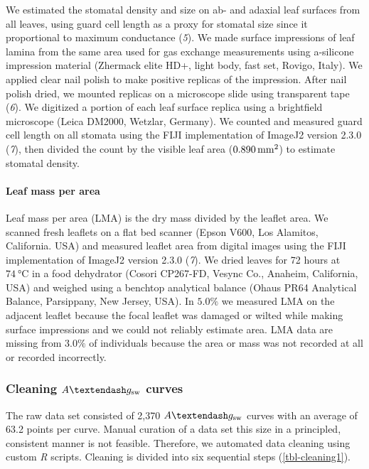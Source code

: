 \documentclass[
  letterpaper,
  DIV=11,
  numbers=noendperiod]{scrartcl}
\let\oldparagraph\paragraph
\renewcommand{\paragraph}[1]{\oldparagraph{#1}\mbox{}}
\newcommand{\agcurve}{$A \textendash g_\text{sw}$}
\begin{document}
We estimated the stomatal density and size on ab- and adaxial leaf
surfaces from all leaves, using guard cell length as a proxy for
stomatal size since it proportional to maximum conductance (\emph{5}).
We made surface impressions of leaf lamina from the same area used for
gas exchange measurements using a-silicone impression material (Zhermack
elite HD+, light body, fast set, Rovigo, Italy). We applied clear nail
polish to make positive replicas of the impression. After nail polish
dried, we mounted replicas on a microscope slide using transparent tape
(\emph{6}). We digitized a portion of each leaf surface replica using a
brightfield microscope (Leica DM2000, Wetzlar, Germany). We counted and
measured guard cell length on all stomata using the FIJI implementation
of ImageJ2 version 2.3.0 (\emph{7}), then divided the count by the
visible leaf area (\(\qty{0.890}{\raiseto{2}\milli\meter}\)) to estimate
stomatal density.

\paragraph{Leaf mass per area}\label{leaf-mass-per-area}

Leaf mass per area (LMA) is the dry mass divided by the leaflet area. We
scanned fresh leaflets on a flat bed scanner (Epson V600, Los Alamitos,
California. USA) and measured leaflet area from digital images using the
FIJI implementation of ImageJ2 version 2.3.0 (\emph{7}). We dried leaves
for 72 hours at \(\qty{74}{\degreeCelsius}\) in a food dehydrator
(Cosori CP267-FD, Vesync Co., Anaheim, California, USA) and weighed
using a benchtop analytical balance (Ohaus PR64 Analytical Balance,
Parsippany, New Jersey, USA). In \(5.0\%\) we measured LMA on the
adjacent leaflet because the focal leaflet was damaged or wilted while
making surface impressions and we could not reliably estimate area. LMA
data are missing from \(3.0\%\) of individuals because the area or mass
was not recorded at all or recorded incorrectly.

\subsubsection{\texorpdfstring{Cleaning \agcurve{}
curves}{Cleaning  curves}}\label{cleaning-curves}

The raw data set consisted of 2,370 \agcurve{} curves with an average of
63.2 points per curve. Manual curation of a data set this size in a
principled, consistent manner is not feasible. Therefore, we automated
data cleaning using custom \emph{R} scripts. Cleaning is divided into
six sequential steps (\autoref{tbl-cleaning1}).
\end{document}
